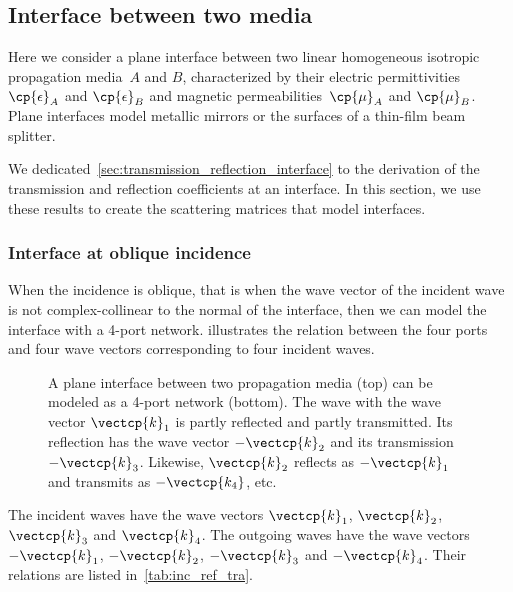 \begin{refsection}

\subsection{Interface between two media}
\label{sec:interface_between_two_media}

Here we consider a plane interface between two linear homogeneous isotropic propagation media~$A$ and $B$, characterized by their electric permittivities~$\cp{\epsilon}_A$ and $\cp{\epsilon}_B$ and magnetic permeabilities~$\cp{\mu}_A$ and $\cp{\mu}_B$.
Plane interfaces model metallic mirrors or the surfaces of a thin-film beam splitter.

We dedicated~\cref{sec:transmission_reflection_interface} to the derivation of the transmission and reflection coefficients at an interface.
In this section, we use these results to create the scattering matrices that model interfaces.

\subsubsection{Interface at oblique incidence}
When the incidence is oblique, that is when the wave vector of the incident wave is not complex-collinear to the normal of the interface, then we can model the interface with a 4-port network.
 illustrates the relation between the four ports and four wave vectors corresponding to four incident waves.

\begin{figure}
    \centering
    
    \caption{A plane interface between two propagation media (top) can be modeled as a 4-port network (bottom).
    The wave with the wave vector $\vectcp{k}_1$ is partly reflected and partly transmitted.
    Its reflection has the wave vector $-\vectcp{k}_2$ and its transmission~$-\vectcp{k}_3$.
    Likewise, $\vectcp{k}_2$ reflects as $-\vectcp{k}_1$ and transmits as $-\vectcp{k_4}$, etc.
    }
    \label{fig:network_interface}
\end{figure}

The incident waves have the wave vectors
$\vectcp{k}_1$, $\vectcp{k}_2$, $\vectcp{k}_3$ and $\vectcp{k}_4$.
The outgoing waves have the wave vectors
$-\vectcp{k}_1$, $-\vectcp{k}_2$, $-\vectcp{k}_3$ and $-\vectcp{k}_4$.
Their relations are listed in~\cref{tab:inc_ref_tra}.


\end{refsection}

